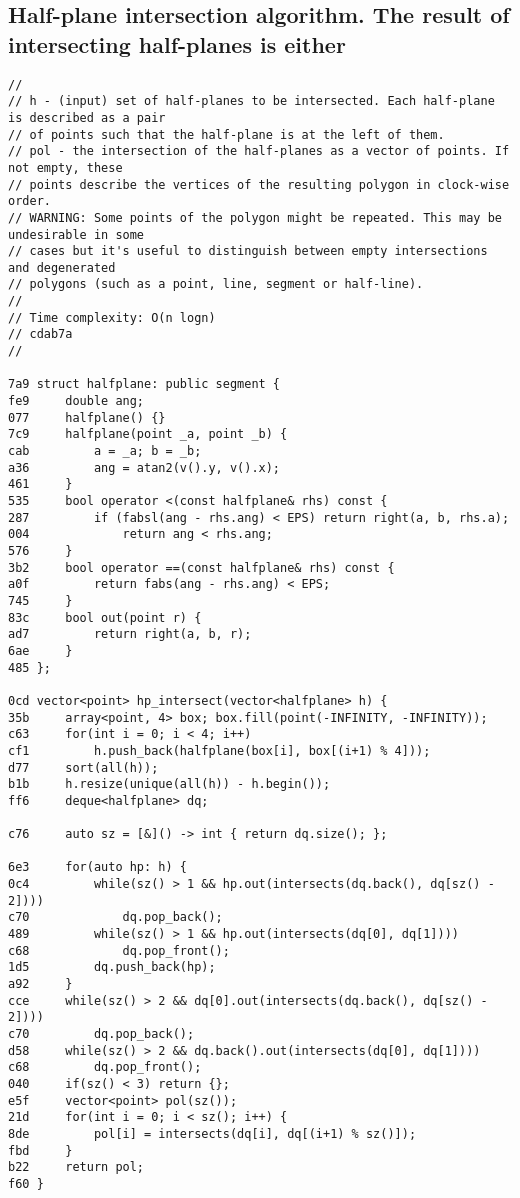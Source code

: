 \documentclass[11pt, a4paper, twoside]{article}
\begin{document}
\subsection{Half-plane intersection algorithm. The result of intersecting half-planes is either}
\begin{lstlisting}
//
// h - (input) set of half-planes to be intersected. Each half-plane is described as a pair
// of points such that the half-plane is at the left of them.
// pol - the intersection of the half-planes as a vector of points. If not empty, these
// points describe the vertices of the resulting polygon in clock-wise order.
// WARNING: Some points of the polygon might be repeated. This may be undesirable in some
// cases but it's useful to distinguish between empty intersections and degenerated
// polygons (such as a point, line, segment or half-line).
//
// Time complexity: O(n logn)
// cdab7a
//

7a9 struct halfplane: public segment {
fe9 	double ang;
077 	halfplane() {}
7c9 	halfplane(point _a, point _b) {
cab 		a = _a; b = _b;
a36 		ang = atan2(v().y, v().x);
461 	}
535 	bool operator <(const halfplane& rhs) const {
287 		if (fabsl(ang - rhs.ang) < EPS) return right(a, b, rhs.a);
004 	        return ang < rhs.ang;
576 	}
3b2 	bool operator ==(const halfplane& rhs) const {
a0f 		return fabs(ang - rhs.ang) < EPS; 
745 	}
83c 	bool out(point r) {
ad7 		return right(a, b, r);
6ae 	}
485 };

0cd vector<point> hp_intersect(vector<halfplane> h) {
35b 	array<point, 4> box; box.fill(point(-INFINITY, -INFINITY));
c63 	for(int i = 0; i < 4; i++)
cf1 		h.push_back(halfplane(box[i], box[(i+1) % 4]));
d77 	sort(all(h));
b1b 	h.resize(unique(all(h)) - h.begin());
ff6 	deque<halfplane> dq;
    
c76 	auto sz = [&]() -> int { return dq.size(); };
    
6e3 	for(auto hp: h) {
0c4 		while(sz() > 1 && hp.out(intersects(dq.back(), dq[sz() - 2])))
c70 			dq.pop_back();
489 		while(sz() > 1 && hp.out(intersects(dq[0], dq[1])))
c68 			dq.pop_front();
1d5 		dq.push_back(hp);
a92 	}
cce 	while(sz() > 2 && dq[0].out(intersects(dq.back(), dq[sz() - 2])))
c70 		dq.pop_back();
d58 	while(sz() > 2 && dq.back().out(intersects(dq[0], dq[1])))
c68 		dq.pop_front();
040 	if(sz() < 3) return {};
e5f 	vector<point> pol(sz());
21d 	for(int i = 0; i < sz(); i++) {
8de 		pol[i] = intersects(dq[i], dq[(i+1) % sz()]);
fbd 	}
b22 	return pol;
f60 }
\end{lstlisting}
\end{document}
